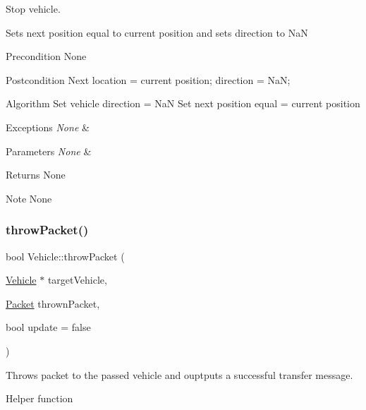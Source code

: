 Stop vehicle. 

Sets next position equal to current position and sets direction to NaN

\begin{DoxyPrecond}{Precondition}
None
\end{DoxyPrecond}
\begin{DoxyPostcond}{Postcondition}
Next location = current position; direction = NaN;
\end{DoxyPostcond}
\begin{DoxyParagraph}{Algorithm}
Set vehicle direction = NaN Set next position equal = current position
\end{DoxyParagraph}

\begin{DoxyExceptions}{Exceptions}
{\em None} & \\
\hline
\end{DoxyExceptions}

\begin{DoxyParams}{Parameters}
{\em None} & \\
\hline
\end{DoxyParams}
\begin{DoxyReturn}{Returns}
None
\end{DoxyReturn}
\begin{DoxyNote}{Note}
None 
\end{DoxyNote}
\hypertarget{class_vehicle_a8858df03bffec647e3c72a58530a600b}{}\label{class_vehicle_a8858df03bffec647e3c72a58530a600b} 
\subsubsection{\texorpdfstring{throw\+Packet()}{throwPacket()}}
{\footnotesize\ttfamily bool Vehicle\+::throw\+Packet (\begin{DoxyParamCaption}\item[{\hyperlink{class_vehicle}{Vehicle} $\ast$}]{target\+Vehicle,  }\item[{\hyperlink{struct_packet}{Packet}}]{thrown\+Packet,  }\item[{bool}]{update = {\ttfamily false} }\end{DoxyParamCaption})}



Throws packet to the passed vehicle and ouptputs a successful transfer message. 

Helper function


